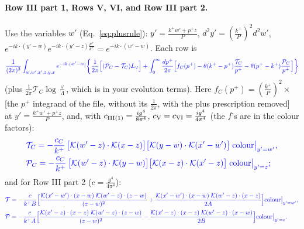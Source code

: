 \documentclass[10pt]{article}
\numberwithin{equation}{section}
\newcommand{\new}[1]{{\color{blue}#1}}
\newcommand{\Lv}{L_{\vee}}
\newcommand{\KK}{\mathcal K}
\newcommand{\pre}{\frac{1}{(2\pi)^3}}
\newcommand{\phw}{e^{-ik\cdot(w'-w)}}
\begin{document}
\paragraph{Row III part 1, Rows V, VI, and Row III part 2.} Use the variables $w'$ (Eq.~\eqref{eq:plusrule}): $y'=\frac{k^+w'+p^+z}{P}$, $d^2y'=(\frac{k^+}{P})^2d^2w'$, $e^{-ik\cdot(y'-w)}e^{-ik\cdot(y'-z)\frac{p^+}{k^+}}=e^{-ik\cdot(w'-w)}$. Each row is
\begin{equation}
\new{\pre\int_{w,w',x',z,y,x}\phw\bigg\{\frac{1}{2\pi}\Big[(\mathcal P_C-\mathcal T_C)\Lv\Big]+\int_0^\infty\frac{dp^+}{2\pi}\Big[f_C(p^+)-\theta(k^+-p^+)\frac{\mathcal T_C}{p^+}-\theta(p^+-k^+)\frac{\mathcal P_C}{p^+}\Big]\bigg\}}
\label{eq:Crow}
\end{equation}
(plus $\frac{1}{2\pi}\mathcal T_C\log\frac\vee\Lambda$, which is in your evolution terms). Here $f_C(p^+)=(\frac{k^+}{P})^2\times$[the $p^+$ integrand of the file, without its $\frac{1}{2\pi}$, with the plus prescription removed] at $y'=\frac{k^+w'+p^+z}{P}$, and, with $c_{\rm III(1)}=\frac{ig^4}{8\pi^4}$, $c_{\rm V}=c_{\rm VI}=\frac{ig^4}{4\pi^4}$ (the $f$'s are in the colour factors):
\begin{align*}
&\new{\mathcal T_C=-\frac{c_C}{k^+}\,\big[\KK(w'-z)\cdot\KK(x-z)\big]\big[\KK(y-w)\cdot\KK(x'-w')\big]\;\text{colour}\big|_{y'=w'},}\\
&\new{\mathcal P_C=-\frac{c_C}{k^+}\,\big[\KK(w'-z)\cdot\KK(y-w)\big]\big[\KK(x-z)\cdot\KK(x'-z)\big]\;\text{colour}\big|_{y'=z};}
\end{align*}
and for Row III part 2 ($c=\frac{g^4}{4\pi^4}$):
\begin{align*}
&\new{\mathcal T=-\frac{c}{k^+B}\Big[\frac{\KK(x'-w')\cdot(x-w)\;\KK(w'-z)\cdot(z-w)}{(z-w)^2}+\frac{\KK(x'-w')\cdot(x-w)\;\KK(w'-z)\cdot(x-z)}{2A}\Big]\text{colour}\big|_{y'=w'},}\\
&\new{\mathcal P=-\frac{c}{k^+A}\Big[\frac{\KK(x'-z)\cdot(x-z)\;\KK(w'-z)\cdot(z-w)}{(z-w)^2}-\frac{\KK(x'-z)\cdot(x-z)\;\KK(w'-z)\cdot(x-w)}{2B}\Big]\text{colour}\big|_{y'=z}.}
\end{align*}
\end{document}
